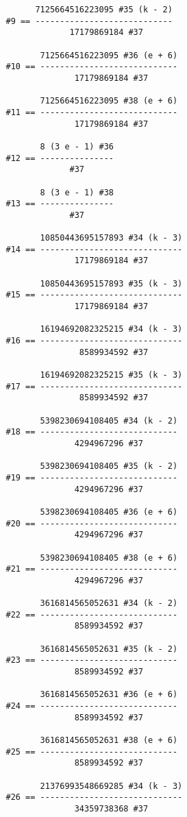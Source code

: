 \documentclass[../main.tex]{subfiles}
\begin{document}
\begin{verbatim}
         7125664516223095 #35 (k - 2)
   #9 == ----------------------------
                17179869184 #37

          7125664516223095 #36 (e + 6)
   #10 == ----------------------------
                 17179869184 #37

          7125664516223095 #38 (e + 6)
   #11 == ----------------------------
                 17179869184 #37

          8 (3 e - 1) #36
   #12 == ---------------
                #37

          8 (3 e - 1) #38
   #13 == ---------------
                #37

          10850443695157893 #34 (k - 3)
   #14 == -----------------------------
                 17179869184 #37

          10850443695157893 #35 (k - 3)
   #15 == -----------------------------
                 17179869184 #37

          16194692082325215 #34 (k - 3)
   #16 == -----------------------------
                  8589934592 #37

          16194692082325215 #35 (k - 3)
   #17 == -----------------------------
                  8589934592 #37

          5398230694108405 #34 (k - 2)
   #18 == ----------------------------
                 4294967296 #37

          5398230694108405 #35 (k - 2)
   #19 == ----------------------------
                 4294967296 #37

          5398230694108405 #36 (e + 6)
   #20 == ----------------------------
                 4294967296 #37

          5398230694108405 #38 (e + 6)
   #21 == ----------------------------
                 4294967296 #37

          3616814565052631 #34 (k - 2)
   #22 == ----------------------------
                 8589934592 #37

          3616814565052631 #35 (k - 2)
   #23 == ----------------------------
                 8589934592 #37

          3616814565052631 #36 (e + 6)
   #24 == ----------------------------
                 8589934592 #37

          3616814565052631 #38 (e + 6)
   #25 == ----------------------------
                 8589934592 #37

          21376993548669285 #34 (k - 3)
   #26 == -----------------------------
                 34359738368 #37


\end{verbatim}
\end{document}
